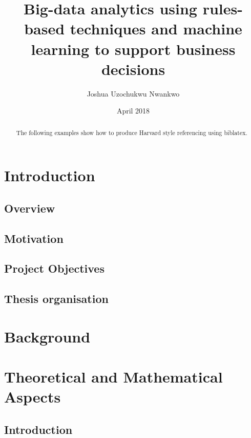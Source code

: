 \documentclass[12pt, letterpaper, titlepage]{report}
\title{\textbf{Big-data analytics using rules-based techniques and machine learning to support business decisions}}
\author{Joshua Uzochukwu Nwankwo}
\date{April 2018}
\begin{document}
\def\code#1{\texttt{#1}}

\maketitle
\newpage

\begin{abstract}
The following examples show how to produce Harvard style referencing using biblatex.
\end{abstract}

\tableofcontents
\newpage

\chapter{Introduction}
\section{Overview}
\section{Motivation}
\section{Project Objectives}
\section{Thesis organisation}

\chapter{Background}

\chapter{Theoretical and Mathematical Aspects}
\section{Introduction}
\end{document}
